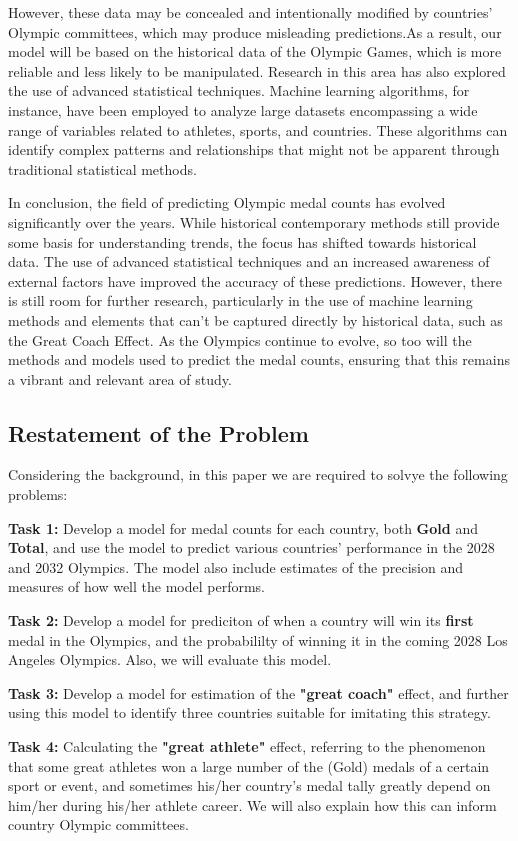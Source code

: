 However, these data may be concealed and intentionally modified by countries' Olympic committees, which may produce misleading predictions.As a result, our model will be based on the historical data of the Olympic Games, which is more reliable and less likely to be manipulated.
Research in this area has also explored the use of advanced statistical techniques. Machine learning algorithms, for instance, have been employed to analyze large datasets encompassing a wide range of variables related to athletes, sports, and countries. These algorithms can identify complex patterns and relationships that might not be apparent through traditional statistical methods.

In conclusion, the field of predicting Olympic medal counts has evolved significantly over the years. While historical contemporary methods still provide some basis for understanding trends, the focus has shifted towards historical data. The use of advanced statistical techniques and an increased awareness of external factors have improved the accuracy of these predictions. 
However, there is still room for further research, particularly in the use of machine learning methods and elements that can't be captured directly by historical data, such as the Great Coach Effect. As the Olympics continue to evolve, so too will the methods and models used to predict the medal counts, ensuring that this remains a vibrant and relevant area of study.

\subsection{Restatement of the Problem}
Considering the background, in this paper we are required to solvye the following problems:

\textbf{Task 1:} Develop a model for medal counts for each country, both \textbf{Gold} and \textbf{Total}, and use the model to predict various countries' performance in the 2028 and 2032 Olympics. The model also include estimates of the precision and measures of how well the model performs.

\textbf{Task 2:} Develop a model for prediciton of when a country will win its \textbf{first} medal in the Olympics, and the probabililty of winning it in the coming 2028 Los Angeles Olympics. Also, we will evaluate this model.

\textbf{Task 3:} Develop a model for estimation of the \textbf{"great coach"} effect, and further using this model to identify three countries suitable for imitating this strategy.

\textbf{Task 4:} Calculating the \textbf{"great athlete"} effect, referring to the phenomenon that some great athletes won a large number of the (Gold) medals of a certain sport or event, and sometimes his/her country's medal tally greatly depend on him/her during his/her athlete career. We will also explain how this can inform country Olympic committees.
